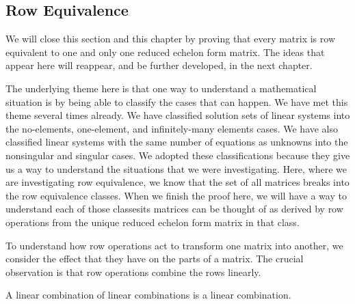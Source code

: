 



















\subsection{Row Equivalence}
We will close this section and this chapter by proving 
that every matrix is row equivalent to one
and only one reduced echelon form matrix.
The ideas that appear here will reappear, and be further developed, in the
next chapter.

The underlying theme here is that one way to understand a
mathematical situation is by being able to classify the cases that can happen.
We have met this theme several times already.
We have classified solution sets of linear systems into the no-elements, 
one-element, and infinitely-many elements cases.
We have also classified linear systems with the same number of equations 
as unknowns into the nonsingular and singular cases.
We adopted these classifications because they give us a way to understand
the situations that we were investigating.
Here, where we are investigating row equivalence, we know that the set of all
matrices breaks into the row equivalence classes.
When we finish the proof here, we will have a way to understand each of those
classes\Dash its matrices can be thought of as derived by row operations from the
unique reduced echelon form matrix in that class.

To understand how row operations act to transform one matrix into another,
we consider the effect that they have on the parts of a matrix.
The crucial observation is that row operations combine the rows linearly.



\begin{lemma} 
A linear combination of linear combinations is a linear combination.
\end{lemma}

